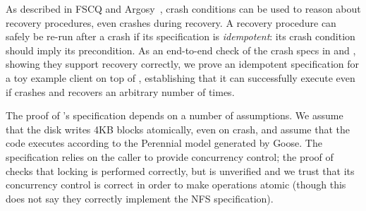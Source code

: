 As described in FSCQ and Argosy~\cite{chen:fscq,chajed:argosy}, crash conditions
can be used to reason about recovery procedures, even crashes during recovery. A
recovery procedure can safely be re-run after a crash if its specification is
\emph{idempotent}: its crash condition should imply its precondition. As an
end-to-end check of the crash specs in \simplenfs and \txn, showing they support
recovery correctly, we prove an idempotent specification for a toy example
client on top of \simplenfs, establishing that it can successfully execute even if
\simplenfs crashes and recovers an arbitrary number of times.

The proof of \txn's specification depends on a number of assumptions. We assume
that the disk writes 4KB blocks atomically, even on crash, and assume that the
code executes according to the Perennial model generated by Goose. The
specification relies on the caller to provide concurrency control; the proof of
\simplenfs checks that locking is performed correctly, but \gnfs is unverified
and we trust that its concurrency control is correct in order to make operations
atomic (though this does not say they correctly implement the NFS
specification).

%   
%
